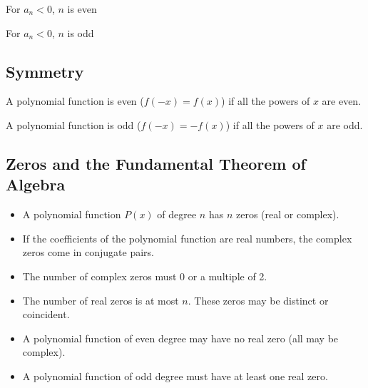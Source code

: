 			\begin{minipage}{0.5\textwidth}
				\centering
				For $a_n < 0$, $n$ is even
				\vspace{\baselineskip}

			\end{minipage}
			\begin{minipage}{0.5\textwidth}
				\centering
				For $a_n < 0$, $n$ is odd
				\vspace{\baselineskip}

			\end{minipage}
		\subsection{Symmetry}
			A polynomial function is even ($f(-x)=f(x)$) if all the powers of $x$ are even.

			A polynomial function is odd ($f(-x)=-f(x)$) if all the powers of $x$ are odd.
		\subsection{Zeros and the Fundamental Theorem of Algebra}
			\begin{itemize}
				\item A polynomial function $P(x)$ of degree $n$ has $n$ zeros (real or complex).
				\item If the coefficients of the polynomial function are real numbers, the complex zeros come in conjugate pairs.
				\item The number of complex zeros must 0 or a multiple of 2.
				\item The number of real zeros is at most $n$. These zeros may be distinct or coincident.
				\item A polynomial function of even degree may have no real zero (all may be complex).
				\item A polynomial function of odd degree must have at least one real zero.
			\end{itemize}
